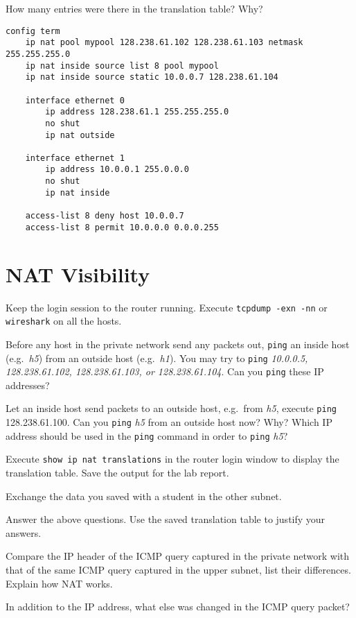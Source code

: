 \documentclass{../UTNetLab}
\begin{document}
    \begin{report}
    \item How many entries were there in the translation table? Why?
    \end{report}
    
    \begin{lstlisting}[language={cisco}, emph={mypool}, caption={NAT Router Configuration in Fig. 8.7}]
config term
    ip nat pool mypool 128.238.61.102 128.238.61.103 netmask 255.255.255.0
    ip nat inside source list 8 pool mypool
    ip nat inside source static 10.0.0.7 128.238.61.104

    interface ethernet 0
        ip address 128.238.61.1 255.255.255.0
        no shut
        ip nat outside

    interface ethernet 1
        ip address 10.0.0.1 255.0.0.0
        no shut
        ip nat inside

    access-list 8 deny host 10.0.0.7
    access-list 8 permit 10.0.0.0 0.0.0.255
    \end{lstlisting}

\section{NAT Visibility}
    Keep the login session to the router running. Execute \lstinline{tcpdump -exn -nn} or \lstinline{wireshark} on all the hosts. 

    Before any host in the private network send any packets out, \lstinline{ping} an inside host (e.g.\ \textit{h5}) from an outside host (e.g.\ \textit{h1}). You may try to \lstinline{ping} \textit{10.0.0.5, 128.238.61.102, 128.238.61.103, or 128.238.61.104}. Can you \lstinline{ping} these IP addresses? 

    Let an inside host send packets to an outside host, e.g.\ from \textit{h5}, execute \lstinline{ping} 128.238.61.100. Can you \lstinline{ping} \textit{h5} from an outside host now? Why? Which IP address should be used in the \lstinline{ping} command in order to \lstinline{ping} \textit{h5}? 

    Execute \lstinline[language=cisco]{show ip nat translations} in the router login window to display the translation table. Save the output for the lab report. 

    Exchange the data you saved with a student in the other subnet.

    \begin{report}
    \item Answer the above questions.
    Use the saved translation table to justify your answers.
    
    \item Compare the IP header of the ICMP query captured in the private network with that of the same ICMP query captured in the upper subnet, list their differences.
    Explain how NAT works.
    
    \item In addition to the IP address, what else was changed in the ICMP query packet?
    \end{report}
\end{document}
